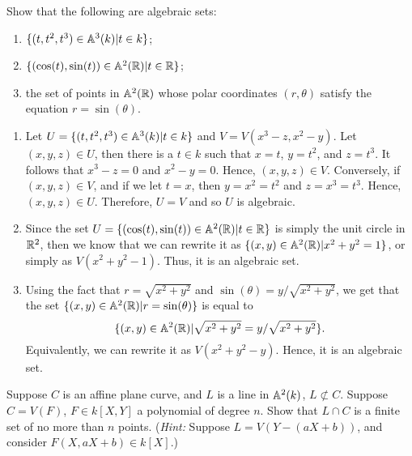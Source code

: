 \begin{exercise}
    Show that the following are algebraic sets:
    \begin{enumerate}[label=(\alph*)]
        \item $\{(t, t^2, t^3) \in \mathbb{A}^3(k) | t \in k\}$;
        \item $\{(\cos(t), \sin(t)) \in \mathbb{A}^2(\mathbb{R}) | t \in \mathbb{R}\}$;
        \item the set of points in $\mathbb{A}^2(\mathbb{R})$ whose polar coordinates $(r, \theta)$ satisfy the equation $r = \sin(\theta)$.
    \end{enumerate}
\end{exercise}

\begin{solution}
    \begin{enumerate}[label=(\alph*)]
        \item Let $U = \{(t, t^2, t^3) \in \mathbb{A}^3(k) | t \in k\}$ and $V = V(x^3 - z, x^2 - y)$. Let $(x,y,z) \in U$, then there is a $t \in k$ such that $x=t$, $y=t^2$, and $z = t^3$. It follows that $x^3 - z = 0$ and $x^2 - y = 0$. Hence, $(x,y,z) \in V$. Conversely, if $(x,y,z) \in V$, and if we let $t = x$, then $y = x^2 = t^2$ and $z = x^3 = t^3$. Hence, $(x,y,z) \in U$. Therefore, $U = V$ and so $U$ is algebraic.
        \item Since the set $U = \{(\cos(t), \sin(t)) \in \mathbb{A}^2(\mathbb{R}) | t \in \mathbb{R}\}$ is simply the unit circle in $\mathbb{R}^2$, then we know that we can rewrite it as $\{(x,y) \in \mathbb{A}^2(\mathbb{R}) | x^2 + y^2 = 1\}$, or simply as $V(x^2 + y^2 - 1)$. Thus, it is an algebraic set.
        \item Using the fact that $r = \sqrt{x^2 + y^2}$ and $\sin(\theta) = y/\sqrt{x^2 + y^2}$, we get that the set $\{(x,y) \in \mathbb{A}^2(\mathbb{R}) | r = \sin(\theta)\}$ is equal to
        $$\{(x,y) \in \mathbb{A}^2(\mathbb{R}) | \sqrt{x^2 + y^2} = y/\sqrt{x^2 + y^2}\}.$$
        Equivalently, we can rewrite it as $V(x^2 + y^2 - y)$. Hence, it is an algebraic set. \\
    \end{enumerate}
\end{solution}

\begin{exercise}
    Suppose $C$ is an affine plane curve, and $L$ is a line in $\mathbb{A}^2(k)$, $L \not\subset C$. Suppose $C = V(F)$, $F \in k[X,Y]$ a polynomial of degree $n$. Show that $L \cap C$ is a finite set of no more than $n$ points. (\textit{Hint:} Suppose $L = V(Y - (aX+b))$, and consider $F(X,aX+b) \in k[X]$.) \\
\end{exercise}

